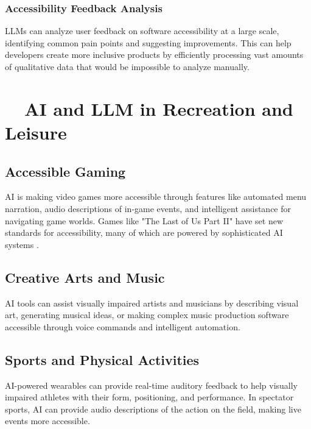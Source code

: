 \subsubsection{Accessibility Feedback Analysis}\label{ch9:sssec:feedback-analysis}
LLMs can analyze user feedback on software accessibility at a large scale, identifying common pain points and suggesting improvements. This can help developers create more inclusive products by efficiently processing vast amounts of qualitative data that would be impossible to analyze manually.

\section{~~AI and LLM in Recreation and Leisure}\label{ch9:sec:recreation}

\subsection{Accessible Gaming}\label{ch9:ssec:accessible-gaming}
AI is making video games more accessible through features like automated menu narration, audio descriptions of in-game events, and intelligent assistance for navigating game worlds. Games like "The Last of Us Part II" have set new standards for accessibility, many of which are powered by sophisticated AI systems \supercite{TLOU2Accessibility}.

\subsection{Creative Arts and Music}\label{ch9:ssec:creative-arts}
AI tools can assist visually impaired artists and musicians by describing visual art, generating musical ideas, or making complex music production software accessible through voice commands and intelligent automation.

\subsection{Sports and Physical Activities}\label{ch9:ssec:sports}
AI-powered wearables can provide real-time auditory feedback to help visually impaired athletes with their form, positioning, and performance. In spectator sports, AI can provide audio descriptions of the action on the field, making live events more accessible.

